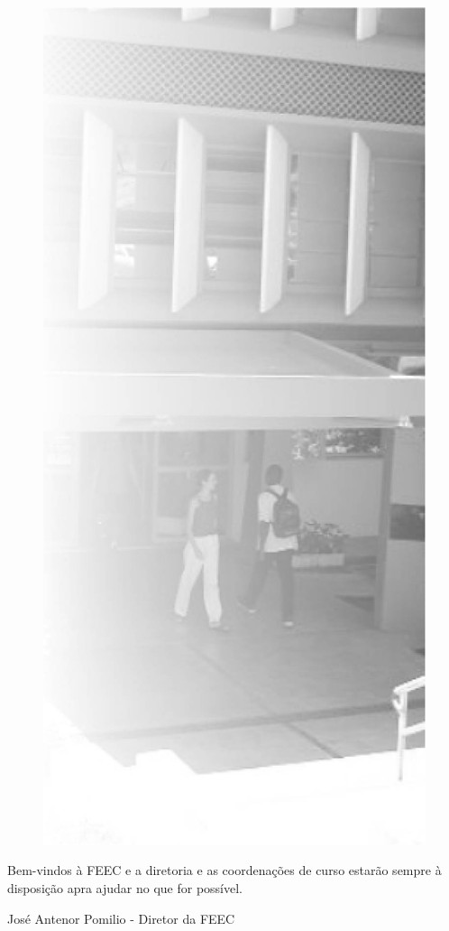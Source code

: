 \begin{figure}
    \includegraphics[scale=0.30, keepaspectratio=true]{img/imgs/3-feec/feec.jpg}
\end{figure}

Bem-vindos à FEEC e a diretoria e as
coordenações de curso estarão sempre à disposição apra ajudar no que for
possível.


José Antenor Pomilio - Diretor da FEEC


